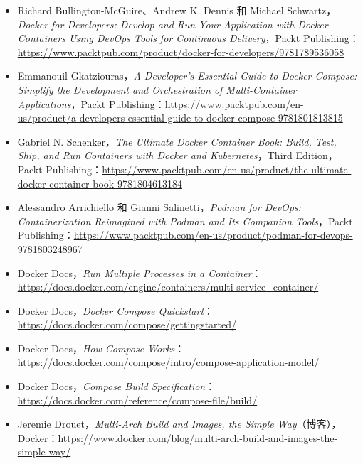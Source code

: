 \begin{itemize}
\item Richard Bullington-McGuire、Andrew K. Dennis 和 Michael Schwartz，\emph{Docker for Developers: Develop and Run Your Application with Docker Containers Using DevOps Tools for Continuous Delivery}，Packt Publishing：\href{https://www.packtpub.com/en-us/product/docker-for-developers-9781789536058}{https://www.packtpub.com/product/docker-for-developers/9781789536058}
\item Emmanouil Gkatziouras，\emph{A Developer’s Essential Guide to Docker Compose: Simplify the Development and Orchestration of Multi-Container Applications}，Packt Publishing：\href{https://www.packtpub.com/en-us/product/a-developers-essential-guide-to-docker-compose-9781801813815}{https://www.packtpub.com/en-us/product/a-developers-essential-guide-to-docker-compose-9781801813815}
\item Gabriel N. Schenker，\emph{The Ultimate Docker Container Book: Build, Test, Ship, and Run Containers with Docker and Kubernetes}，Third Edition，Packt Publishing：\href{https://www.packtpub.com/en-us/product/the-ultimate-docker-container-book-9781804613184}{https://www.packtpub.com/en-us/product/the-ultimate-docker-container-book-9781804613184}
\item Alessandro Arrichiello 和 Gianni Salinetti，\emph{Podman for DevOps: Containerization Reimagined with Podman and Its Companion Tools}，Packt Publishing：\href{https://www.packtpub.com/en-us/product/podman-for-devops-9781803248967}{https://www.packtpub.com/en-us/product/podman-for-devops-9781803248967}
\item Docker Docs，\emph{Run Multiple Processes in a Container}：\href{https://docs.docker.com/engine/containers/multi-service_container/}{https://docs.docker.com/engine/containers/multi-service\_container/}
\item Docker Docs，\emph{Docker Compose Quickstart}：\href{https://docs.docker.com/compose/gettingstarted/}{https://docs.docker.com/compose/gettingstarted/}
\item Docker Docs，\emph{How Compose Works}：\href{https://docs.docker.com/compose/intro/compose-application-model/}{https://docs.docker.com/compose/intro/compose-application-model/}
\item Docker Docs，\emph{Compose Build Specification}：\href{https://docs.docker.com/reference/compose-file/build/}{https://docs.docker.com/reference/compose-file/build/}
\item Jeremie Drouet，\emph{Multi-Arch Build and Images, the Simple Way}（博客），Docker：\href{https://www.docker.com/blog/multi-arch-build-and-images-the-simple-way/}{https://www.docker.com/blog/multi-arch-build-and-images-the-simple-way/}

\end{itemize}
